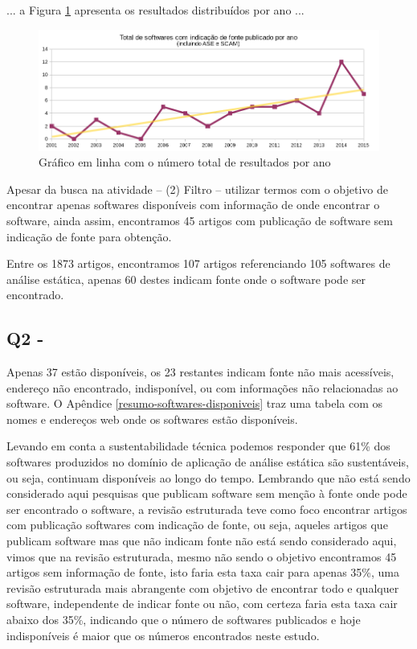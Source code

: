 ... a Figura \ref{softwares-por-ano} apresenta os resultados distribuídos por ano ...

\begin{figure}[h]
  \center
  \includegraphics[scale=0.65]{imagens/softwares-por-ano.png}
  \caption{Gráfico em linha com o número total de resultados por ano}
  \label{softwares-por-ano}
\end{figure}

Apesar da busca na atividade -- (2) Filtro -- utilizar termos com o objetivo de
encontrar apenas softwares disponíveis com informação de onde encontrar o
software, ainda assim, encontramos 45 artigos com publicação de software sem
indicação de fonte para obtenção.

Entre os 1873 artigos, encontramos 107 artigos referenciando 105 softwares de
análise estática, apenas 60 destes indicam fonte onde o software pode ser
encontrado.

\subsection{Q2 - \QuestaoDois}

Apenas 37 estão disponíveis, os 23 restantes indicam fonte não mais
acessíveis, endereço não encontrado, indisponível, ou com informações não
relacionadas ao software. O Apêndice \ref{resumo-softwares-disponiveis} traz
uma tabela com os nomes e endereços web onde os softwares estão disponíveis.

Levando em conta a sustentabilidade técnica podemos responder que 61\% dos
softwares produzidos no domínio de aplicação de análise estática são
sustentáveis, ou seja, continuam disponíveis ao longo do tempo. Lembrando que
não está sendo considerado aqui pesquisas que publicam software sem menção à
fonte onde pode ser encontrado o software, a revisão estruturada teve como foco encontrar
artigos com publicação softwares com indicação de fonte, ou seja, aqueles
artigos que publicam software mas que não indicam fonte não está sendo
considerado aqui, vimos que na revisão estruturada, mesmo não sendo o objetivo
encontramos 45 artigos sem informação de fonte, isto faria esta taxa cair para
apenas 35\%, uma revisão estruturada mais abrangente com objetivo de encontrar
todo e qualquer software, independente de indicar fonte ou não, com certeza
faria esta taxa cair abaixo dos 35\%, indicando que o número de softwares
publicados e hoje indisponíveis é maior que os números encontrados neste estudo.

